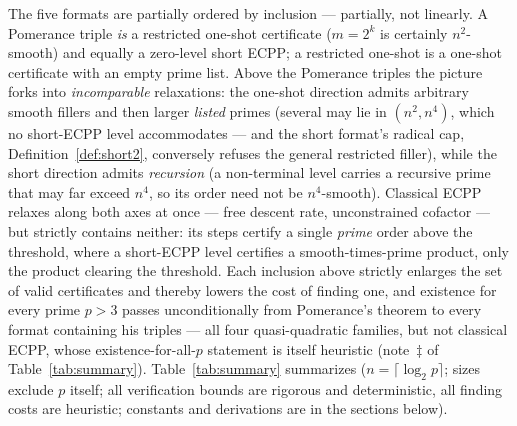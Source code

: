 \documentclass[11pt]{amsart}
\theoremstyle{plain}
\theoremstyle{definition}
\theoremstyle{remark}
\begin{document}
The five formats are partially ordered by inclusion --- partially, not linearly.  A Pomerance triple
\emph{is} a restricted one-shot certificate ($m = 2^k$ is certainly $n^2$-smooth) and equally a
zero-level short ECPP; a restricted one-shot is a one-shot certificate with an empty prime list.
Above the Pomerance triples the picture forks into \emph{incomparable} relaxations: the one-shot
direction admits arbitrary smooth fillers and then larger \emph{listed} primes (several may lie in
$(n^2, n^4)$, which no short-ECPP level accommodates --- and the short format's radical cap,
Definition~\ref{def:short2}, conversely refuses the general restricted filler), while the short
direction admits \emph{recursion} (a non-terminal level carries a recursive prime that may far exceed
$n^4$, so its order need not be $n^4$-smooth).  Classical ECPP relaxes along both axes at once ---
free descent rate, unconstrained cofactor --- but strictly contains neither: its steps certify a
single \emph{prime} order above the threshold, where a short-ECPP level certifies a
smooth-times-prime product, only the product clearing the threshold.  Each inclusion above strictly
enlarges the set of valid certificates and thereby lowers the cost of finding one, and existence for
every prime $p > 3$ passes unconditionally from Pomerance's theorem to every format containing his
triples --- all four quasi-quadratic families, but not classical ECPP, whose existence-for-all-$p$
statement is itself heuristic (note~$\ddagger$ of Table~\ref{tab:summary}).
Table~\ref{tab:summary} summarizes ($n = \lceil\log_2 p\rceil$; sizes exclude $p$ itself;
all verification bounds are rigorous and deterministic, all finding costs are heuristic; constants and
derivations are in the sections below).
\end{document}

